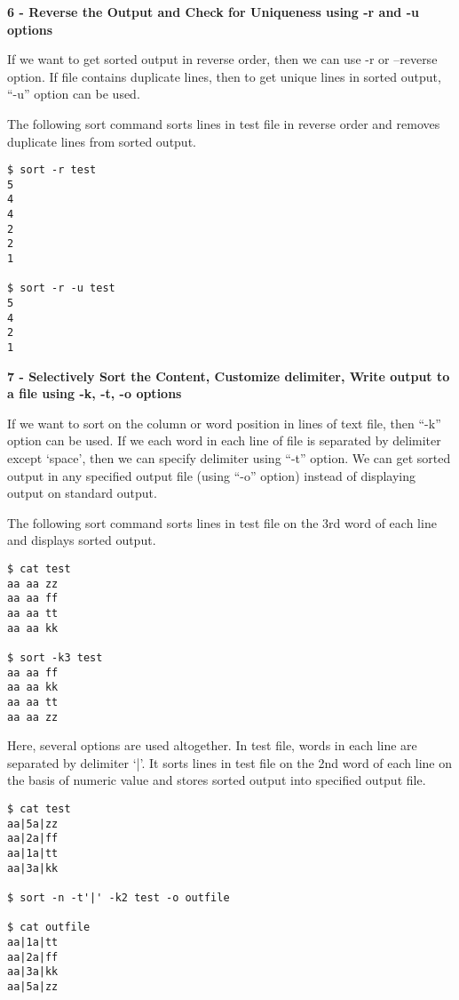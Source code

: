 \documentclass[a4paper,11pt,spanish]{article} %
\newenvironment{myscriptlisting}
{\begin{list}{}{\setlength{\leftmargin}{1em}}\item\scriptsize\bfseries}
{\end{list}}
\begin{document}
\textbf{6 - Reverse the Output and Check for Uniqueness using -r and -u options}

If we want to get sorted output in reverse order, then we can use -r or –reverse
option. If file contains duplicate lines, then to get unique lines in sorted output,
“-u” option can be used.

The following sort command sorts lines in test file in reverse order and removes
duplicate lines from sorted output.

\begin{myscriptlisting}
 \begin{verbatim}
$ sort -r test
5
4
4
2
2
1
 
$ sort -r -u test
5
4
2
1
 \end{verbatim}
\end{myscriptlisting}

\textbf{7 - Selectively Sort the Content, Customize delimiter, Write output to a file using  -k, -t, -o options}

If we want to sort on the column or word position in lines of text file, then “-k” 
option can be used. If we each word in each line of file is separated by delimiter
except ‘space’, then we can specify delimiter using “-t” option. We can get sorted 
output in any specified output file (using “-o” option) instead of displaying output
on standard output.

The following sort command sorts lines in test file on the 3rd word of each line
and displays sorted output.

\begin{myscriptlisting}
 \begin{verbatim}
$ cat test
aa aa zz
aa aa ff
aa aa tt
aa aa kk
 
$ sort -k3 test
aa aa ff
aa aa kk
aa aa tt
aa aa zz
 \end{verbatim}
\end{myscriptlisting}


Here, several options are used altogether. In test file, words in each line are 
separated by delimiter ‘|’. It sorts lines in test file on the 2nd word of each 
line on the basis of numeric value and stores sorted output into specified output file.

\begin{myscriptlisting}
 \begin{verbatim}
$ cat test
aa|5a|zz
aa|2a|ff
aa|1a|tt
aa|3a|kk

$ sort -n -t'|' -k2 test -o outfile

$ cat outfile
aa|1a|tt
aa|2a|ff
aa|3a|kk
aa|5a|zz
 \end{verbatim}
\end{myscriptlisting}
\end{document}
